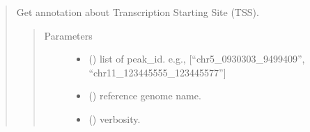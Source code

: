 \documentclass[letterpaper,10pt,english]{sphinxmanual}
\begin{document}
\begin{quote}
\begin{fulllineitems}
\end{fulllineitems}


\begin{fulllineitems}
\label{\detokenize{modules/celloracle.motif_analysis:celloracle.motif_analysis.get_tss_info}}
Get annotation about Transcription Starting Site (TSS).
\begin{quote}\begin{description}
\item[{Parameters}] \leavevmode\begin{itemize}
\item {} 
 () \textendash{} list of peak\_id. e.g., {[}“chr5\_0930303\_9499409”, “chr11\_123445555\_123445577”{]}

\item {} 
 () \textendash{} reference genome name.

\item {} 
 () \textendash{} verbosity.

\end{itemize}

\end{description}\end{quote}

\end{fulllineitems}



\end{quote}
\end{document}
